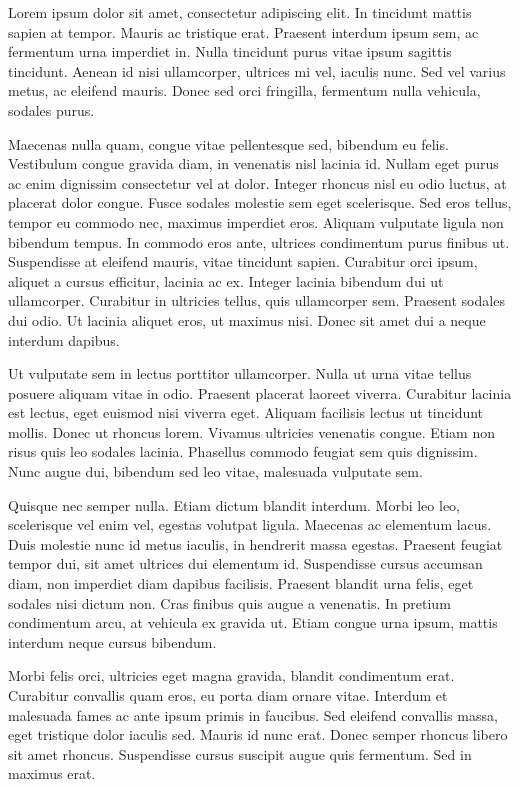 
Lorem ipsum dolor sit amet, consectetur adipiscing elit. In tincidunt mattis sapien at tempor. Mauris ac tristique erat. Praesent interdum ipsum sem, ac fermentum urna imperdiet in. Nulla tincidunt purus vitae ipsum sagittis tincidunt. Aenean id nisi ullamcorper, ultrices mi vel, iaculis nunc. Sed vel varius metus, ac eleifend mauris. Donec sed orci fringilla, fermentum nulla vehicula, sodales purus.

Maecenas nulla quam, congue vitae pellentesque sed, bibendum eu felis. Vestibulum congue gravida diam, in venenatis nisl lacinia id. Nullam eget purus ac enim dignissim consectetur vel at dolor. Integer rhoncus nisl eu odio luctus, at placerat dolor congue. Fusce sodales molestie sem eget scelerisque. Sed eros tellus, tempor eu commodo nec, maximus imperdiet eros. Aliquam vulputate ligula non bibendum tempus. In commodo eros ante, ultrices condimentum purus finibus ut. Suspendisse at eleifend mauris, vitae tincidunt sapien. Curabitur orci ipsum, aliquet a cursus efficitur, lacinia ac ex. Integer lacinia bibendum dui ut ullamcorper. Curabitur in ultricies tellus, quis ullamcorper sem. Praesent sodales dui odio. Ut lacinia aliquet eros, ut maximus nisi. Donec sit amet dui a neque interdum dapibus.

Ut vulputate sem in lectus porttitor ullamcorper. Nulla ut urna vitae tellus posuere aliquam vitae in odio. Praesent placerat laoreet viverra. Curabitur lacinia est lectus, eget euismod nisi viverra eget. Aliquam facilisis lectus ut tincidunt mollis. Donec ut rhoncus lorem. Vivamus ultricies venenatis congue. Etiam non risus quis leo sodales lacinia. Phasellus commodo feugiat sem quis dignissim. Nunc augue dui, bibendum sed leo vitae, malesuada vulputate sem.

Quisque nec semper nulla. Etiam dictum blandit interdum. Morbi leo leo, scelerisque vel enim vel, egestas volutpat ligula. Maecenas ac elementum lacus. Duis molestie nunc id metus iaculis, in hendrerit massa egestas. Praesent feugiat tempor dui, sit amet ultrices dui elementum id. Suspendisse cursus accumsan diam, non imperdiet diam dapibus facilisis. Praesent blandit urna felis, eget sodales nisi dictum non. Cras finibus quis augue a venenatis. In pretium condimentum arcu, at vehicula ex gravida ut. Etiam congue urna ipsum, mattis interdum neque cursus bibendum.

Morbi felis orci, ultricies eget magna gravida, blandit condimentum erat. Curabitur convallis quam eros, eu porta diam ornare vitae. Interdum et malesuada fames ac ante ipsum primis in faucibus. Sed eleifend convallis massa, eget tristique dolor iaculis sed. Mauris id nunc erat. Donec semper rhoncus libero sit amet rhoncus. Suspendisse cursus suscipit augue quis fermentum. Sed in maximus erat.

